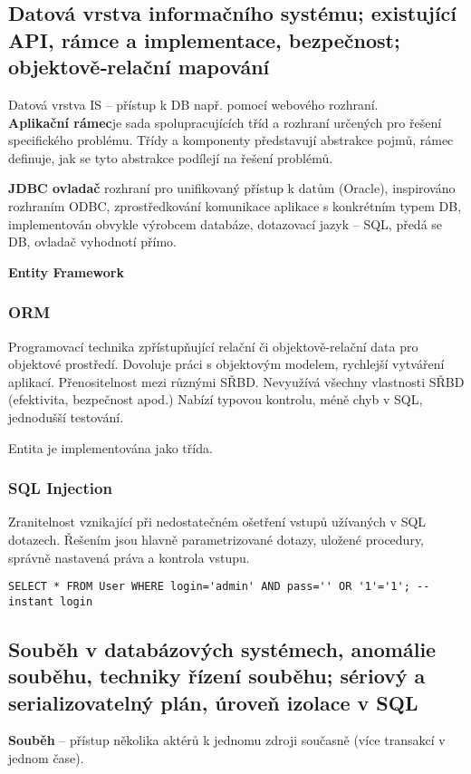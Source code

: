 \subsection[Datová vrsva IS, bezpečnost, frameworky]{Datová vrstva informačního systému; existující API, rámce a implementace, bezpečnost; objektově‐relační mapování}
Datová vrstva IS – přístup k DB např. pomocí webového rozhraní.\\
\textbf{Aplikační rámec}je sada spolupracujících tříd a rozhraní určených pro řešení specifického problému. Třídy a komponenty představují abstrakce pojmů, rámec definuje, jak se tyto abstrakce podílejí na řešení problémů.

\textbf{JDBC ovladač} rozhraní pro unifikovaný přístup k datům (Oracle), inspirováno rozhraním ODBC, zprostředkování komunikace aplikace s konkrétním typem DB, implementován obvykle výrobcem databáze, dotazovací jazyk – SQL, předá se DB, ovladač vyhodnotí přímo.

\textbf{Entity Framework}

\subsubsection{ORM} 
Programovací technika zpřístupňující relační či objektově-relační data pro objektové prostředí. Dovoluje práci s objektovým modelem, rychlejší vytváření aplikací. Přenositelnost mezi různými SŘBD. Nevyužívá všechny vlastnosti SŘBD (efektivita, bezpečnost apod.)
Nabízí typovou kontrolu, méně chyb v SQL, jednodušší testování.

Entita je implementována jako třída.

\subsubsection{SQL Injection}
Zranitelnost vznikající při nedostatečném ošetření vstupů užívaných v SQL dotazech. Řešením jsou hlavně parametrizované dotazy, uložené procedury, správně nastavená práva a kontrola vstupu.

\begin{lstlisting}
SELECT * FROM User WHERE login='admin' AND pass='' OR '1'='1'; --instant login 
\end{lstlisting}

\subsection[Souběh, řízení souběhu v DBS, serializace]{Souběh v databázových systémech, anomálie souběhu, techniky řízení souběhu; sériový a serializovatelný plán, úroveň izolace v SQL}
\textbf{Souběh} -- přístup několika aktérů k jednomu zdroji současně (více transakcí v jednom čase).

